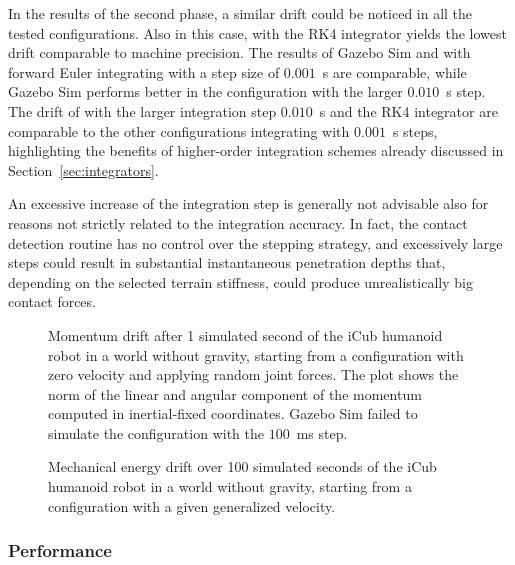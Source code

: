 In the results of the second phase, a similar drift could be noticed in all the tested configurations.
Also in this case, \jaxsim with the \ac{RK4} integrator yields the lowest drift comparable to machine precision.
The results of Gazebo Sim and \jaxsim with forward Euler integrating with a step size of $0.001$~s are comparable, while Gazebo Sim performs better in the configuration with the larger $0.010$~s step.
The drift of \jaxsim with the larger integration step $0.010$~s and the \ac{RK4} integrator are comparable to the other configurations integrating with $0.001$~s steps, highlighting the benefits of higher-order integration schemes already discussed in Section~\ref{sec:integrators}.

An excessive increase of the integration step is generally not advisable also for reasons not strictly related to the integration accuracy.
In fact, the contact detection routine has no control over the stepping strategy, and excessively large steps could result in substantial instantaneous penetration depths that, depending on the selected terrain stiffness, could produce unrealistically big contact forces.

\begin{figure}
    \centering
    \caption{Momentum drift after 1 simulated second of the iCub humanoid robot in a world without gravity, starting from a configuration with zero velocity and applying random joint forces. The plot shows the norm of the linear and angular component of the momentum computed in inertial-fixed coordinates. Gazebo Sim failed to simulate the configuration with the $100$~ms step.}
    \label{fig:jaxsim_conservation_momentum}
\end{figure}

\begin{figure}
    \centering
    \caption{Mechanical energy drift over 100 simulated seconds of the iCub humanoid robot in a world without gravity, starting from a configuration with a given generalized velocity.}
    \label{fig:jaxsim_conservation_energy}
\end{figure}

\newpage
\subsubsection{Performance}

